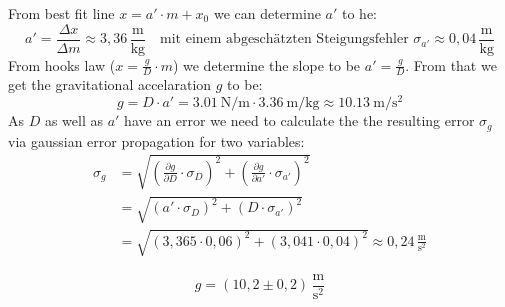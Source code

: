 From best fit line $x = a' \cdot m + x_0$ we can determine $a'$ to he:
\begin{equation}
    a' = \frac{\Delta x}{\Delta m} \approx 3{,}36\,\mathrm{\frac{m}{kg}} \quad \text{mit einem abgeschätzten Steigungsfehler } \sigma_{a'} \approx 0{,}04\,\mathrm{\frac{m}{kg}}
\end{equation}
From hooks law ($x = \frac{g}{D} \cdot m$) we determine the slope to be $a' = \frac{g}{D}$. From that we get the gravitational accelaration $g$ to be:
\begin{equation}
    g = D \cdot a' = \qty{3.01}{\newton \per \meter} \cdot \qty{3.36}{\meter \per \kilogram} \approx \qty{10.13}{\meter \per \second \squared}
\end{equation}
As $D$ as well as $a'$ have an error we need to calculate the the resulting error $\sigma_g$ via gaussian error propagation for two variables:
\begin{align}
    \sigma_g &= \sqrt{ \left( \frac{\partial g}{\partial D} \cdot \sigma_D \right)^2 + \left( \frac{\partial g}{\partial a'} \cdot \sigma_{a'} \right)^2 } \\
             &= \sqrt{ (a' \cdot \sigma_D)^2 + (D \cdot \sigma_{a'})^2 } \\
             &= \sqrt{ (3{,}365 \cdot 0{,}06)^2 + (3{,}041 \cdot 0{,}04)^2 } \approx 0{,}24\,\mathrm{\frac{m}{s^2}}
\end{align}


\begin{resultbox}
    \begin{equation}
        g = (10{,}2 \pm 0{,}2)\,\mathrm{\frac{m}{s^2}}
    \end{equation}
\end{resultbox}





